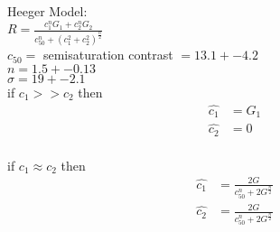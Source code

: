 \documentclass[12pt]{article}
\begin{document}
Heeger Model:\\

$R = \frac{c_1^nG_1 + c_2^nG_2}{c_{50}^n + (c_1^2 + c_2^2)^{\frac{n}{2}}}$\\

$c_{50} = $ semisaturation contrast $ = 13.1 +- 4.2$\\

$n = 1.5 +- 0.13$\\

$\sigma = 19 +- 2.1$\\

if $c_1 >> c_2$ then
\begin{equation}
\begin{aligned}
\hat{c_1} & = G_1\\
\hat{c_2} & = 0\\
\end{aligned}
\end{equation}

if $c_1 \approx c_2$ then
\begin{equation}
\begin{aligned}
\hat{c_1} & = \frac{2G}{c_{50}^n + 2G^{\frac{n}{2}}}\\
\hat{c_2} & = \frac{2G}{c_{50}^n + 2G^{\frac{n}{2}}}\\
\end{aligned}
\end{equation}
\\

\fi
\end{document}
